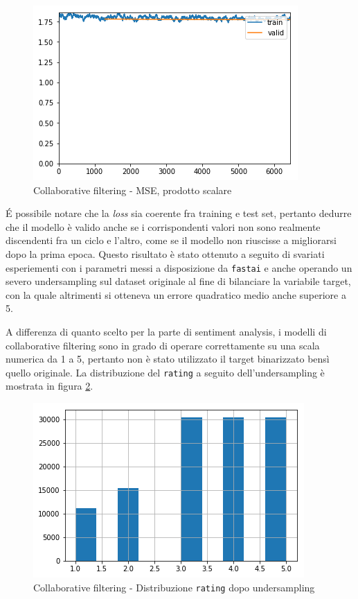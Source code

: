 \documentclass[hidelinks, 12pt]{article}
\begin{document}
\begin{figure}[H]
	\centering
	\includegraphics[scale=0.6]{images/07_02_loss_dot.png}
	\caption[Collaborative filtering - MSE, prodotto scalare]{Collaborative filtering - MSE, prodotto scalare}
	\label{fig:collab-dot-loss}
\end{figure}

É possibile notare che la \textit{loss} sia coerente fra training e test set, pertanto dedurre che il modello è valido anche se i corrispondenti valori non sono realmente discendenti fra un ciclo e l'altro, come se il modello non riuscisse a migliorarsi dopo la prima epoca. Questo risultato è stato ottenuto a seguito di svariati esperiementi con i parametri messi a disposizione da \texttt{fastai} e anche operando un severo undersampling sul dataset originale al fine di bilanciare la variabile target, con la quale altrimenti si otteneva un errore quadratico medio anche superiore a 5.

A differenza di quanto scelto per la parte di sentiment analysis, i modelli di collaborative filtering sono in grado di operare correttamente su una scala numerica da 1 a 5, pertanto non è stato utilizzato il target binarizzato bensì quello originale. La distribuzione del \texttt{rating} a seguito dell'undersampling è mostrata in figura \ref{fig:collab-rating-distr}.

\begin{figure}[H]
	\centering
	\includegraphics[scale=0.6]{images/07_03_rating_distr}
	\caption[Collaborative filtering - Distribuzione \texttt{rating} dopo undersampling]{Collaborative filtering - Distribuzione \texttt{rating} dopo undersampling}
	\label{fig:collab-rating-distr}
\end{figure}
\end{document}
